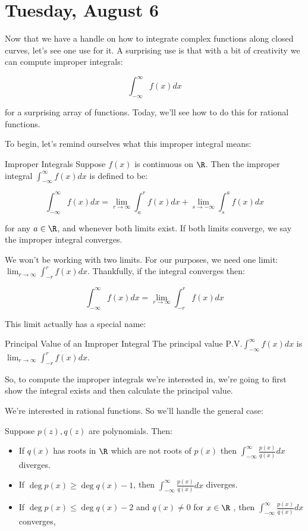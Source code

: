 \section{Tuesday, August 6}


Now that we have a handle on how to integrate complex functions along closed curves, let's see one use for it. A surprising use is that with a bit of creativity we can compute improper integrals:

$$\int_{-\infty}^\infty f(x)dx$$

\noin for a surprising array of functions. Today, we'll see how to do this for rational functions.

To begin, let's remind ourselves what this improper integral means:

\begin{defbo}{Improper Integrals}{} Suppose $f(x)$ is continuous on $\R$. Then the improper integral $\int_{-\infty}^\infty f(x)dx$ is defined to be:

$$\int_{-\infty}^\infty f(x)dx = \lim_{r\rightarrow \infty} \int_{a}^r f(x)dx + \lim_{s\rightarrow -\infty} \int_s^a f(x)dx$$

\noin for any $a\in \R$, and whenever both limits exist. If both limits converge, we say the improper integral converges.\end{defbo}

We won't be working with two limits. For our purposes, we need one limit: $\lim_{r\rightarrow \infty} \int_{-r}^r f(x)dx$. Thankfully, if the integral converges then:

$$\int_{-\infty}^\infty f(x)dx = \lim_{r\rightarrow \infty} \int_{-r}^r f(x)dx$$

This limit actually has a special name:

\begin{defbo}{Principal Value of an Improper Integral}{}
The principal value $\mathrm{P.V.} \int_{-\infty}^\infty f(x)dx$ is $\lim_{r\rightarrow \infty} \int_{-r}^r f(x)dx$.\end{defbo}

So, to compute the improper integrals we're interested in, we're going to first show the integral exists and then calculate the principal value.

We're interested in rational functions. So we'll handle the general case:

\begin{thmbo}{}{} Suppose $p(z),q(z)$ are polynomials. Then:

\begin{itemize}
\item If $q(x)$ has roots in $\R$ which are not roots of $p(x)$ then $\int_{-\infty}^\infty \frac{p(x)}{q(x)}dx$ diverges.
\item If $\deg p(x) \ge \deg q(x) - 1$, then $\int_{-\infty}^\infty \frac{p(x)}{q(x)}dx$ diverges.
\item If $\deg p(x) \le \deg q(x) - 2$ and $q(x) \ne 0$ for $x\in \R$ , then $\int_{-\infty}^\infty \frac{p(x)}{q(x)}dx$ converges,
\end{itemize}
\end{thmbo}

